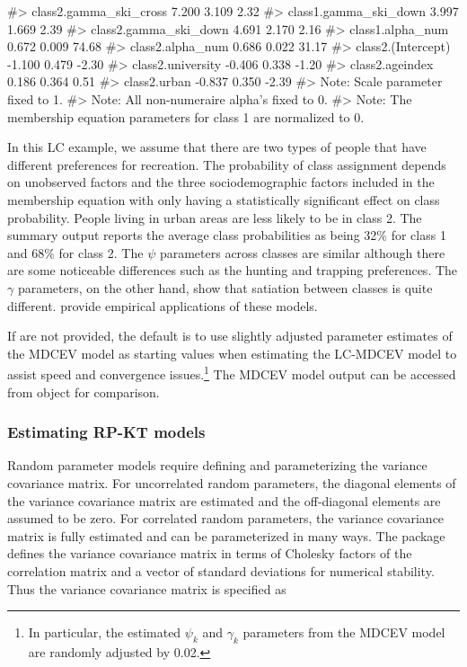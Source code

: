 \begin{Schunk}
\begin{Soutput}
#> class2.gamma_ski_cross         7.200   3.109   2.32
#> class1.gamma_ski_down          3.997   1.669   2.39
#> class2.gamma_ski_down          4.691   2.170   2.16
#> class1.alpha_num               0.672   0.009  74.68
#> class2.alpha_num               0.686   0.022  31.17
#> class2.(Intercept)            -1.100   0.479  -2.30
#> class2.university             -0.406   0.338  -1.20
#> class2.ageindex                0.186   0.364   0.51
#> class2.urban                  -0.837   0.350  -2.39
#> Note: Scale parameter fixed to 1. 
#> Note: All non-numeraire alpha's fixed to 0. 
#> Note: The membership equation parameters for class 1 are normalized to 0.
\end{Soutput}
\end{Schunk}

In this LC example, we assume that there are two types of people that
have different preferences for recreation. The probability of class
assignment depends on unobserved factors and the three sociodemographic
factors included in the membership equation with only 
having a statistically significant effect on class probability. People
living in urban areas are less likely to be in class 2. The summary
output reports the average class probabilities as being 32\% for class 1
and 68\% for class 2. The \(\psi\) parameters across classes are similar
although there are some noticeable differences such as the hunting and
trapping preferences. The \(\gamma\) parameters, on the other hand, show
that satiation between classes is quite different.
\citet{sobhanilatent2013, kuriyamalatent2010} provide empirical
applications of these models.

If  are not provided, the default is to use
slightly adjusted parameter estimates of the MDCEV model as starting
values when estimating the LC-MDCEV model to assist speed and
convergence issues.\footnote{In particular, the estimated \(\psi_k\) and
  \(\gamma_k\) parameters from the MDCEV model are randomly adjusted by
  0.02.} The MDCEV model output can be accessed from
 object for comparison.

\hypertarget{estimating-rp-kt-models}{%
\subsubsection{Estimating RP-KT models}\label{estimating-rp-kt-models}}

Random parameter models require defining and parameterizing the variance
covariance matrix. For uncorrelated random parameters, the diagonal
elements of the variance covariance matrix are estimated and the
off-diagonal elements are assumed to be zero. For correlated random
parameters, the variance covariance matrix is fully estimated and can be
parameterized in many ways. The  package defines the
variance covariance matrix in terms of Cholesky factors of the
correlation matrix and a vector of standard deviations for numerical
stability. Thus the variance covariance matrix is specified as

